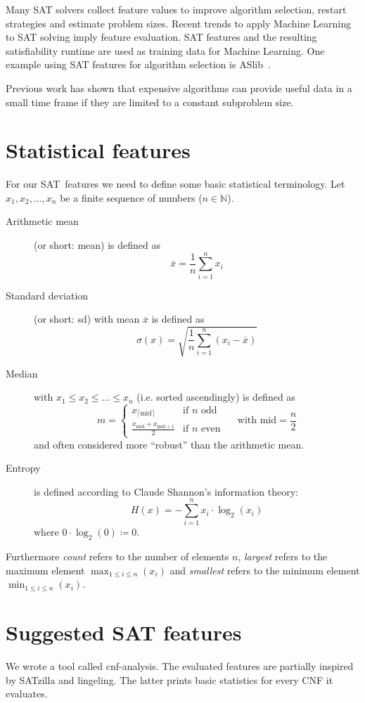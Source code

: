 Many SAT solvers collect feature values to improve algorithm selection,
restart strategies and estimate problem sizes. Recent trends to apply Machine
Learning to SAT solving imply feature evaluation. SAT features and the resulting
satisfiability runtime are used as training data for Machine Learning. One example
using SAT features for algorithm selection is ASlib~\cite{aslib}.

Previous work has shown that expensive algorithms can provide useful data in a
small time frame if they are limited to a constant subproblem size.

\section{Statistical features}
\label{sec:features-stats}
%
For our SAT~features we need to define some basic statistical terminology.
Let $x_1, x_2, \ldots, x_n$ be a finite sequence of numbers ($n \in \mathbb N$).
\begin{description}
  \item[Arithmetic mean] (or short: mean)
    is defined as
    \[ \overline{x} = \frac1n \sum_{i=1}^n x_i \]
  \item[Standard deviation] (or short: sd)
    with mean $\overline{x}$ is defined as
    \[ \sigma(x) = \sqrt{\frac1n \sum_{i=1}^n (x_i - \overline{x})} \]
  \item[Median]
    with $x_1 \leq x_2 \leq \ldots \leq x_n$
    (i.e. sorted ascendingly) is defined as
    \[
       m = \begin{cases}
         x_{\lceil \text{mid}\rceil} & \text{if } n \text{ odd} \\
         \frac{x_{\text{mid}} + x_{\text{mid} + 1}}{2} & \text{if } n \text{ even}
       \end{cases}
       \quad\text{ with } \text{mid} = \frac{n}{2}
    \]
    and often considered more \enquote{robust} than the arithmetic mean.
  \item[Entropy]
    is defined according to Claude Shannon's information theory:
    \[ H(x) = -\sum_{i=1}^n x_i \cdot \log_2(x_i) \]
    where $0 \cdot \log_2(0) \coloneqq 0$.
\end{description}

Furthermore \emph{count} refers to the number of elements $n$,
\emph{largest} refers to the maximum element $\max_{1 \leq i \leq n}(x_i)$
and \emph{smallest} refers to the minimum element $\min_{1 \leq i \leq n}(x_i)$.

\section{Suggested SAT features}
\label{sec:features-suggested}
%
We wrote a tool called cnf-analysis. The evaluated features are partially inspired
by SATzilla and lingeling. The latter prints basic statistics for every CNF it
evaluates.

